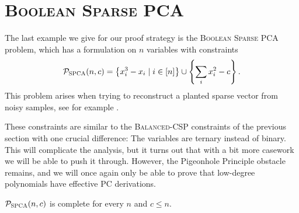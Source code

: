 \section{\textsc{Boolean Sparse PCA}}
The last example we give for our proof strategy is the \textsc{Boolean Sparse PCA} problem, which has a formulation on $n$ variables with constraints
\begin{align*}
\mathcal P_{\textsc{SPCA}}(n,c) = \left\{x_i^3 - x_i \mid i \in [n]\right\} \cup \left\{\sum_i x_i^2 - c\right\}.\label{eq:bspca-formulation}
\end{align*}
This problem arises when trying to reconstruct a planted sparse vector from noisy samples, see for example \cite{MW15}.

These constraints are similar to the \textsc{Balanced-CSP} constraints of the previous section with one crucial difference: The variables are ternary instead of binary.
This will complicate the analysis, but it turns out that with a bit more casework we will be able to push it through.
However, the Pigeonhole Principle obstacle remains, and we will once again only be able to prove that low-degree polynomials have effective PC derivations.
\begin{lemma}\label{lem:bspca-complete}
$\mathcal P_{\textsc{SPCA}}(n,c)$ is complete for every $n$ and $c \leq n$.
\end{lemma}
